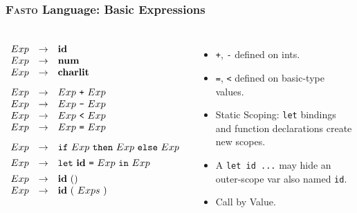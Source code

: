 \documentclass{beamer}
\begin{document}
\begin{frame}[fragile,t]
\frametitle{\textsc{Fasto} Language: Basic Expressions}

\begin{columns}
\renewcommand{\arraystretch}{0.85}
\[\begin{array}{lcl}
Exp & \rightarrow & \mbox{\bf id} \\
Exp & \rightarrow & \mbox{\bf num} \\
Exp & \rightarrow & \mbox{\bf charlit} \\[2ex]

Exp & \rightarrow & Exp~\mbox{\tt +}~ Exp \\
Exp & \rightarrow & Exp~\mbox{\tt -}~ Exp \\
Exp & \rightarrow & Exp~\mbox{\tt <}~ Exp \\
Exp & \rightarrow & Exp~\mbox{\tt =}~ Exp \\[2ex]

Exp & \rightarrow & \mbox{\tt if}~Exp~\mbox{\tt then}~ Exp~\mbox{\tt else}~Exp\\[1ex]

Exp & \rightarrow & \mbox{\tt let}~\mbox{\bf id}~\mbox{\tt =}~Exp~\mbox{\tt in}~Exp \\[1ex]

Exp & \rightarrow & \mbox{\bf id}~() \\
Exp & \rightarrow & \mbox{\bf id}~(~Exps~) \\

\end{array}\]

\begin{itemize}
    \item {\tt +}, {\tt -} defined on ints.
    \item {\tt =}, {\tt <} defined on basic-type values.
    \item Static Scoping: {\tt let} bindings and function declarations create new scopes.
    \item A {\tt let id ...} may hide an outer-scope var also named {\tt id}.
    \item Call by Value.
\end{itemize}
\end{columns}

\end{frame}
\end{document}
